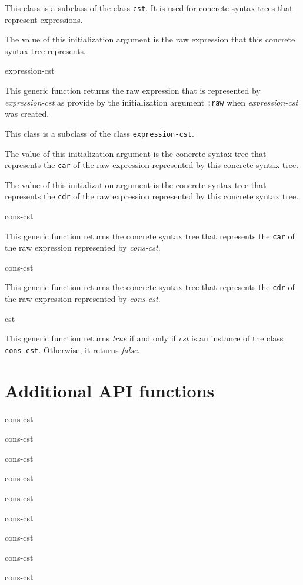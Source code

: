 
This class is a subclass of the class \texttt{cst}.  It is used for
concrete syntax trees that represent \commonlisp{} expressions.


The value of this initialization argument is the raw \commonlisp{}
expression that this concrete syntax tree represents.

 {expression-cst}

This generic function returns the raw \commonlisp{} expression that is
represented by \textit{expression-cst} as provide by the
initialization argument \texttt{:raw} when \textit{expression-cst} was
created.


This class is a subclass of the class \texttt{expression-cst}.


The value of this initialization argument is the concrete syntax tree
that represents the \texttt{car} of the raw \commonlisp{} expression
represented by this concrete syntax tree.


The value of this initialization argument is the concrete syntax tree
that represents the \texttt{cdr} of the raw \commonlisp{} expression
represented by this concrete syntax tree.

 {cons-cst}

This generic function returns the concrete syntax tree that represents
the \texttt{car} of the raw \commonlisp{} expression represented by
\textit{cons-cst}.

 {cons-cst}

This generic function returns the concrete syntax tree that represents
the \texttt{cdr} of the raw \commonlisp{} expression represented by
\textit{cons-cst}.

 {cst}

This generic function returns \emph{true} if and only if \textit{cst}
is an instance of the class \texttt{cons-cst}.  Otherwise, it returns
\emph{false}.

\section{Additional API functions}

 {cons-cst}

 {cons-cst}

 {cons-cst}

 {cons-cst}

 {cons-cst}

 {cons-cst}

 {cons-cst}

 {cons-cst}

 {cons-cst}
